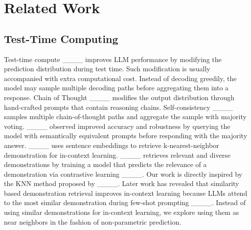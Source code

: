 \section{Related Work}
\subsection{Test-Time Computing}
Test-time compute ____ improves LLM performance by modifying the prediction distribution during test time. Such modification is usually accompanied with extra computational cost. Instead of decoding greedily, the model may sample multiple decoding paths before aggregating them into a response. Chain of Thought ____ modifies the output distribution through hand-crafted prompts that contain reasoning chains. 
Self-consistency ____ samples multiple chain-of-thought paths and aggregate the sample with majority voting. ____ observed improved accuracy and robustness by querying the model with semantically equivalent prompts before responding with the majority answer. 
____ uses sentence embeddings to retrieve k-nearest-neighbor demonstration for in-context learning. ____ retrieves relevant and diverse demonstrations by training a model that predicts the relevance of a demonstration via contrastive learning ____. 
Our work is directly inspired by the KNN method proposed by ____. Later work has revealed that similarity based demonstration retrieval improves in-context learning because LLMs attend to the most similar demonstration during few-shot prompting ____. Instead of using similar demonstrations for in-context learning, we explore using them as near neighbors in the fashion of non-parametric prediction.


